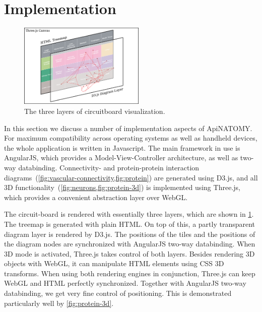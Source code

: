 \section{Implementation} \label{sect:implementation}                                     %

\begin{figure}
	\centering
	\includegraphics[width=6cm]{images/visual-layers.png}
	\caption{The three layers of circuitboard visualization.}
	\label{fig:visual-layers}
\end{figure}

In this section we discuss a number of implementation aspects of \mbox{ApiNATOMY}.
For maximum compatibility across operating systems as well as handheld devices,
the whole application is written in Javascript. The main framework in use is
AngularJS, which provides a Model-View-Controller architecture, as well as
two-way databinding. Connectivity- and protein-protein
interaction diagrams~(\cref{fig:vascular-connectivity,fig:protein})
are generated using D3.js, and all 3D functionality~(\cref{fig:neurons,fig:protein-3d})
is implemented using Three.js, which provides a convenient abstraction layer over WebGL.


The circuit-board is rendered with essentially three layers,
which are shown in \cref{fig:visual-layers}. The treemap is generated
with plain HTML. On top of this, a partly transparent diagram layer is
rendered by D3.js. The positions of the tiles and the positions of the
diagram nodes are synchronized with AngularJS two-way databinding.
When 3D mode is activated, Three.js takes control of both layers.
Besides rendering 3D objects with WebGL, it can manipulate HTML
elements using CSS 3D transforms. When using both rendering engines
in conjunction, Three.js can keep WebGL and HTML perfectly synchronized.
Together with AngularJS two-way databinding, we get very fine control
of positioning. This is demonstrated particularly well by \cref{fig:protein-3d}.


